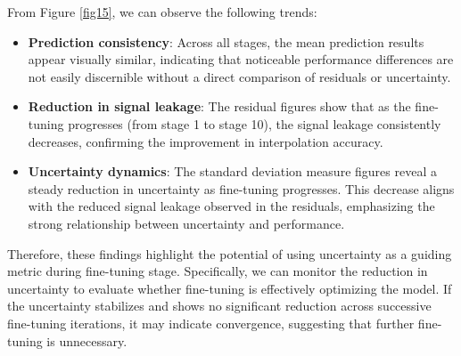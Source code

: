 From Figure \ref{fig15}, we can observe the following trends:
\begin{itemize}
    \item \textbf{Prediction consistency}: Across all stages, the mean prediction results appear visually similar, indicating that noticeable performance differences are not easily discernible without a direct comparison of residuals or uncertainty.
    \item \textbf{Reduction in signal leakage}: The residual figures show that as the fine-tuning progresses (from stage 1 to stage 10), the signal leakage consistently decreases, confirming the improvement in interpolation accuracy.
    \item \textbf{Uncertainty dynamics}: The standard deviation measure figures reveal a steady reduction in uncertainty as fine-tuning progresses. This decrease aligns with the reduced signal leakage observed in the residuals, emphasizing the strong relationship between uncertainty and performance.
\end{itemize}

Therefore, these findings highlight the potential of using uncertainty as a guiding metric during fine-tuning stage. Specifically, we can monitor the reduction in uncertainty to evaluate whether fine-tuning is effectively optimizing the model. If the uncertainty stabilizes and shows no significant reduction across successive fine-tuning iterations, it may indicate convergence, suggesting that further fine-tuning is unnecessary.
